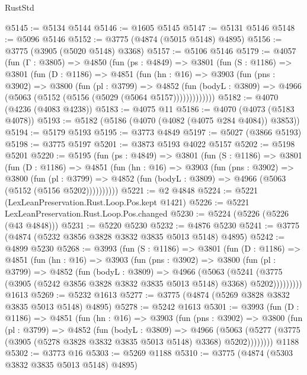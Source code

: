 \begin{lexlean}{RustStd}
\begin{coremodule}
@5145 := @5134 @5144
@5146 := @1605 @5145
@5147 := @5131 @5146
@5148 := @5096 @5146
@5152 := @3775 (@4874 (@5015 @5148) @4895)
@5156 := @3775 (@3905 (@5020 @5148) @3368)
@5157 := @5106 @5146
@5179 := @4057
    (fun (Γ : @3805) =>
    @4850
      (fun (ps : @4849) =>
      @3801
        (fun (S : @1186) =>
        @3801
          (fun (D : @1186) =>
          @4851
            (fun (hn : @16) =>
            @3903
              (fun (pns : @3902) =>
              @3800
                (fun (pl : @3799) =>
                @4852
                  (fun (bodyL : @3809) =>
                  @4966 (@5063 (@5152 (@5156 (@5029 (@5064 @5157)))))))))))))
@5182 := @4070 (@4236 (@4083 @4238))
@5183 := @4075 @11
@5186 := @4070 (@4073 (@5183 @4078))
@5193 := @5182 (@5186 (@4070 (@4082 (@4075 @284 @4084)) @3853))
@5194 := @5179 @5193
@5195 := @3773 @4849
@5197 := @5027 (@3866 @5193)
@5198 := @3775 @5197
@5201 := @3873 @5193 @4022 @5157
@5202 := @5198 @5201
@5220 := @5195
    (fun (ps : @4849) =>
    @3801
      (fun (S : @1186) =>
      @3801
        (fun (D : @1186) =>
        @4851
          (fun (hn : @16) =>
          @3903
            (fun (pns : @3902) =>
            @3800
              (fun (pl : @3799) =>
              @4852 (fun (bodyL : @3809) => @4966 (@5063 (@5152 (@5156 @5202))))))))))
@5221 := @2 @4848
@5224 := @5221 (LexLeanPreservation.Rust.Loop.Pos.kept @1421)
@5226 := @5221 LexLeanPreservation.Rust.Loop.Pos.changed
@5230 := @5224 (@5226 (@5226 (@43 @4848)))
@5231 := @5220 @5230
@5232 := @4876 @5230
@5241 := @3775 (@4874 (@5232 @3856 @3828 @3832 @3835 @5013 @5148) @4895)
@5242 := @4899 @5230
@5268 := @3993
    (fun (S : @1186) =>
    @3801
      (fun (D : @1186) =>
      @4851
        (fun (hn : @16) =>
        @3903
          (fun (pns : @3902) =>
          @3800
            (fun (pl : @3799) =>
            @4852
              (fun (bodyL : @3809) =>
              @4966
                (@5063
                  (@5241
                    (@3775 (@3905 (@5242 @3856 @3828 @3832 @3835 @5013 @5148) @3368) @5202)))))))))
    @1613
@5269 := @5232 @1613
@5277 := @3775 (@4874 (@5269 @3828 @3832 @3835 @5013 @5148) @4895)
@5278 := @5242 @1613
@5301 := @3993
    (fun (D : @1186) =>
    @4851
      (fun (hn : @16) =>
      @3903
        (fun (pns : @3902) =>
        @3800
          (fun (pl : @3799) =>
          @4852
            (fun (bodyL : @3809) =>
            @4966
              (@5063 (@5277 (@3775 (@3905 (@5278 @3828 @3832 @3835 @5013 @5148) @3368) @5202))))))))
    @1188
@5302 := @3773 @16
@5303 := @5269 @1188
@5310 := @3775 (@4874 (@5303 @3832 @3835 @5013 @5148) @4895)

\end{coremodule}
\end{lexlean}
